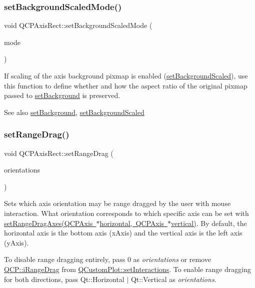 \subsubsection{\texorpdfstring{setBackgroundScaledMode()}{setBackgroundScaledMode()}}
{\footnotesize\ttfamily void Q\+C\+P\+Axis\+Rect\+::set\+Background\+Scaled\+Mode (\begin{DoxyParamCaption}\item[{Qt\+::\+Aspect\+Ratio\+Mode}]{mode }\end{DoxyParamCaption})}

If scaling of the axis background pixmap is enabled (\mbox{\hyperlink{class_q_c_p_axis_rect_ae6d36c3e0e968ffb991170a018e7b503}{set\+Background\+Scaled}}), use this function to define whether and how the aspect ratio of the original pixmap passed to \mbox{\hyperlink{class_q_c_p_axis_rect_af615ab5e52b8e0a9a0eff415b6559db5}{set\+Background}} is preserved. \begin{DoxySeeAlso}{See also}
\mbox{\hyperlink{class_q_c_p_axis_rect_af615ab5e52b8e0a9a0eff415b6559db5}{set\+Background}}, \mbox{\hyperlink{class_q_c_p_axis_rect_ae6d36c3e0e968ffb991170a018e7b503}{set\+Background\+Scaled}} 
\end{DoxySeeAlso}
\mbox{\label{class_q_c_p_axis_rect_ae6aef2f7211ba6097c925dcd26008418}} 
\subsubsection{\texorpdfstring{setRangeDrag()}{setRangeDrag()}}
{\footnotesize\ttfamily void Q\+C\+P\+Axis\+Rect\+::set\+Range\+Drag (\begin{DoxyParamCaption}\item[{Qt\+::\+Orientations}]{orientations }\end{DoxyParamCaption})}

Sets which axis orientation may be range dragged by the user with mouse interaction. What orientation corresponds to which specific axis can be set with \mbox{\hyperlink{class_q_c_p_axis_rect_a648cce336bd99daac4a5ca3e5743775d}{set\+Range\+Drag\+Axes(\+Q\+C\+P\+Axis $\ast$horizontal, Q\+C\+P\+Axis $\ast$vertical)}}. By default, the horizontal axis is the bottom axis (x\+Axis) and the vertical axis is the left axis (y\+Axis).

To disable range dragging entirely, pass 0 as {\itshape orientations} or remove \mbox{\hyperlink{namespace_q_c_p_a2ad6bb6281c7c2d593d4277b44c2b037a2c4432b9aceafb94000be8d1b589ef18}{Q\+C\+P\+::i\+Range\+Drag}} from \mbox{\hyperlink{class_q_custom_plot_a5ee1e2f6ae27419deca53e75907c27e5}{Q\+Custom\+Plot\+::set\+Interactions}}. To enable range dragging for both directions, pass {\ttfamily Qt\+::\+Horizontal $\vert$ Qt\+::\+Vertical} as {\itshape orientations}.

